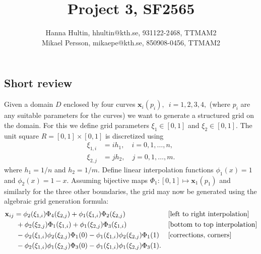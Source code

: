 \documentclass[a4paper,10pt]{article}
\title{Project 3, SF2565}
\author{Hanna Hultin, hhultin@kth.se, 931122-2468, TTMAM2 \\ Mikael Persson, mikaepe@kth.se, 850908-0456, TTMAM2}
\newcommand{\ve}{\mathbf}
\begin{document}
\maketitle

\subsection*{Short review}
Given a domain $D$ enclosed by four curves $\ve{x}_i (p_i), \enspace i = 1,2,3,4,$  
(where $p_i$ are any suitable parameters for the curves)
we want to generate a structured grid on the domain.
For this we define grid parameters $\xi_1 \in [0,1]$ and $\xi_2 \in [0,1]$.
The unit square $R = [0,1]\times[0,1]$ is discretized using 
\begin{align*}
  \xi_{1,i} &= i h_1,\quad i = 0,1,\dots,n, \\
  \xi_{2,j} &= j h_2,\quad j = 0,1,\dots,m.
\end{align*}
where $h_1 = 1/n$ and $h_2 = 1/m$. Define linear interpolation functions $\phi_1(x) = 1$ and
$\phi_2(x) = 1-x$.
Assuming bijective maps $\Phi_1 : [0,1] \mapsto \ve{x}_1(p_1)$ and similarly for the three other
boundaries, the grid may now be generated using the algebraic grid generation formula:
\begin{align*}
  \ve{x}_{ij} &= \phi_2(\xi_{1,i}) \Phi_4 (\xi_{2,j}) + \phi_1(\xi_{1,i}) \Phi_2(\xi_{2,j}) 
  &&\text{[left to right interpolation]}\\
  &\hspace{1mm}+ \phi_2(\xi_{2,j}) \Phi_1(\xi_{1,i}) + \phi_1(\xi_{2,j}) \Phi_3(\xi_{1,i})
  &&\text{[bottom to top interpolation]} \\
  &\hspace{1mm}- \phi_2(\xi_{1,i}) \phi_2(\xi_{2,j}) \Phi_1(0) - 
  \phi_1(\xi_{1,i}) \phi_2(\xi_{2,j}) \Phi_1(1) 
  &&\text{[corrections, corners]}\\
  &\hspace{1mm}- \phi_2(\xi_{1,i}) \phi_1(\xi_{2,j}) \Phi_3(0) -
  \phi_1(\xi_{1,i}) \phi_1(\xi_{2,j}) \Phi_3(1)
  .
\end{align*}
\end{document}
